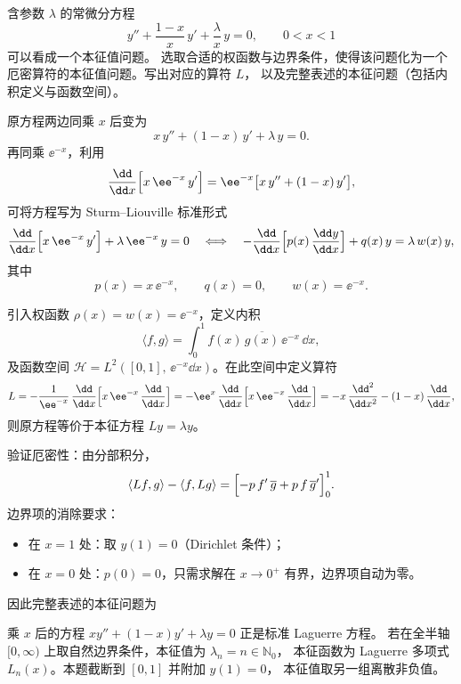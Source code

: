 \begin{question}[Laguerre方程的本征值问题]

含参数 $\lambda$ 的常微分方程
\[
y'' + \frac{1-x}{x}\,y' + \frac{\lambda}{x}\,y = 0, \qquad 0 < x < 1
\]
可以看成一个本征值问题。
选取合适的权函数与边界条件，使得该问题化为一个
厄密算符的本征值问题。写出对应的算符 $L$，
以及完整表述的本征问题（包括内积定义与函数空间）。

\begin{solution}

原方程两边同乘 $x$ 后变为
\[
x\,y'' + (1-x)\,y' + \lambda\,y = 0.
\]
再同乘 $\ee^{-x}$，利用
\[
\frac{\dd}{\dd x}\Bigl[x\,\ee^{-x}\,y'\Bigr]
= \ee^{-x}\bigl[x\,y'' + (1-x)\,y'\bigr],
\]
可将方程写为 Sturm--Liouville 标准形式
\[
\frac{\dd}{\dd x}\Bigl[x\,\ee^{-x}\,y'\Bigr] + \lambda\,\ee^{-x}\,y = 0
\quad\Longleftrightarrow\quad
-\frac{\dd}{\dd x}\Bigl[p(x)\,\frac{\dd y}{\dd x}\Bigr] + q(x)\,y = \lambda\,w(x)\,y,
\]
其中
\[
p(x) = x\,\ee^{-x},\qquad q(x) = 0,\qquad w(x) = \ee^{-x}.
\]

引入权函数 $\rho(x) = w(x) = \ee^{-x}$，定义内积
\[
\langle f,g\rangle = \int_{0}^{1} f(x)\,\overline{g(x)}\,\ee^{-x}\,\dd x,
\]
及函数空间 $\mathcal{H} = L^{2}([0,1],\,\ee^{-x}\dd x)$。在此空间中定义算符
\[
L = -\frac{1}{\ee^{-x}}\,\frac{\dd}{\dd x}\Bigl[x\,\ee^{-x}\,\frac{\dd}{\dd x}\Bigr]
= -\ee^{x}\,\frac{\dd}{\dd x}\Bigl[x\,\ee^{-x}\,\frac{\dd}{\dd x}\Bigr]
= -x\,\frac{\dd^{2}}{\dd x^{2}} - (1-x)\,\frac{\dd}{\dd x},
\]
则原方程等价于本征方程 $L y = \lambda y$。

验证厄密性：由分部积分，
\[
\langle Lf, g\rangle - \langle f, Lg\rangle
= \Bigl[-p\,f'\,\overline{g} + p\,f\,\overline{g}'\Bigr]_{0}^{1}.
\]
边界项的消除要求：
\begin{itemize}
  \item 在 $x=1$ 处：取 $y(1)=0$（Dirichlet 条件）；
  \item 在 $x=0$ 处：$p(0)=0$，只需求解在 $x\to0^{+}$ 有界，边界项自动为零。
\end{itemize}

因此完整表述的本征问题为


乘 $x$ 后的方程 $x y'' + (1-x) y' + \lambda y = 0$ 正是标准 Laguerre 方程。
若在全半轴 $[0,\infty)$ 上取自然边界条件，本征值为 $\lambda_{n}=n\in\mathbb{N}_{0}$，
本征函数为 Laguerre 多项式 $L_{n}(x)$。本题截断到 $[0,1]$ 并附加 $y(1)=0$，
本征值取另一组离散非负值。

\end{solution}
\end{question}

